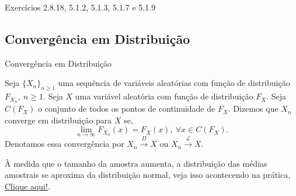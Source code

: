 \documentclass[12pt]{beamer}
\begin{document}
\begin{frame}{}
\begin{block}{\Home}
\justifying
Exercícios 2.8.18, 5.1.2, 5.1.3, 5.1.7 e 5.1.9
\end{block}
\end{frame}

\subsection{Convergência em Distribuição}
\begin{frame}{Convergência em Distribuição}
\begin{definicao}
\justifying
Seja $\{X_{n}\}_{n\geq 1}$ uma sequência de variáveis aleatórias com função de distribuição $F_{X_{n}},~n\geq 1.$ Seja $X$ uma variável aleatória com função de distribuição $F_{X}.$ Seja $C(F_{X})$ o conjunto de todos os pontos de continuidade de $F_{X}$. Dizemos que $X_{n}$ converge em distribuição para $X$ se,
$$\lim_{{n \to \infty}} F_{X_{n}}(x) = F_X(x), ~\forall x \in C(F_X).$$ Denotamos essa convergência por $X_{n} \overset{D}{\rightarrow} X$ ou $X_{n} \overset{\mathcal{L}}{\rightarrow} X.$
\end{definicao}
\pause
\begin{block}{}
	À medida que o tamanho da amostra aumenta, a distribuição das médias amostrais se aproxima da distribuição normal, veja isso acontecendo na prática, \href{https://est711.shinyapps.io/ConvergenciaProbabilidade/}{Clique aqui!}.
\end{block}

\end{frame}
\end{document}
